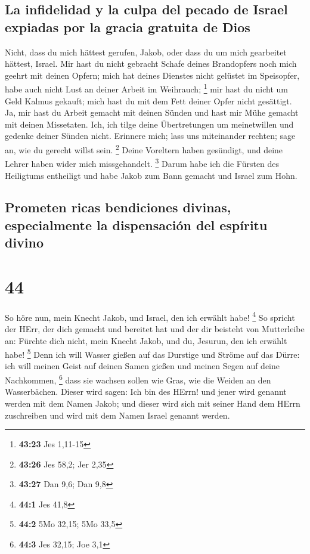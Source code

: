 \hypertarget{la-infidelidad-y-la-culpa-del-pecado-de-israel-expiadas-por-la-gracia-gratuita-de-dios}{%
\subsection{La infidelidad y la culpa del pecado de Israel expiadas por
la gracia gratuita de
Dios}\label{la-infidelidad-y-la-culpa-del-pecado-de-israel-expiadas-por-la-gracia-gratuita-de-dios}}

 Nicht, dass du mich hättest gerufen, Jakob, oder dass du
um mich gearbeitet hättest, Israel.  Mir hast du nicht
gebracht Schafe deines Brandopfers noch mich geehrt mit deinen Opfern;
mich hat deines Dienstes nicht gelüstet im Speisopfer, habe auch nicht
Lust an deiner Arbeit im Weihrauch; \footnote{\textbf{43:23} Jes 1,11-15}
 mir hast du nicht um Geld Kalmus gekauft; mich hast du
mit dem Fett deiner Opfer nicht gesättigt. Ja, mir hast du Arbeit
gemacht mit deinen Sünden und hast mir Mühe gemacht mit deinen
Missetaten.  Ich, ich tilge deine Übertretungen um
meinetwillen und gedenke deiner Sünden nicht.  Erinnere
mich; lass uns miteinander rechten; sage an, wie du gerecht willst sein.
\footnote{\textbf{43:26} Jes 58,2; Jer 2,35}  Deine
Voreltern haben gesündigt, und deine Lehrer haben wider mich
missgehandelt. \footnote{\textbf{43:27} Dan 9,6; Dan 9,8}
 Darum habe ich die Fürsten des Heiligtums entheiligt und
habe Jakob zum Bann gemacht und Israel zum Hohn.

\hypertarget{prometen-ricas-bendiciones-divinas-especialmente-la-dispensaciuxf3n-del-espuxedritu-divino}{%
\subsection{Prometen ricas bendiciones divinas, especialmente la
dispensación del espíritu
divino}\label{prometen-ricas-bendiciones-divinas-especialmente-la-dispensaciuxf3n-del-espuxedritu-divino}}

\hypertarget{section-43}{%
\section{44}\label{section-43}}

 So höre nun, mein Knecht Jakob, und Israel, den ich
erwählt habe! \footnote{\textbf{44:1} Jes 41,8}  So
spricht der HErr, der dich gemacht und bereitet hat und der dir beisteht
von Mutterleibe an: Fürchte dich nicht, mein Knecht Jakob, und du,
Jesurun, den ich erwählt habe! \footnote{\textbf{44:2} 5Mo 32,15; 5Mo
  33,5}  Denn ich will Wasser gießen auf das Durstige und
Ströme auf das Dürre: ich will meinen Geist auf deinen Samen gießen und
meinen Segen auf deine Nachkommen, \footnote{\textbf{44:3} Jes 32,15;
  Joe 3,1}  dass sie wachsen sollen wie Gras, wie die
Weiden an den Wasserbächen.  Dieser wird sagen: Ich bin
des HErrn! und jener wird genannt werden mit dem Namen Jakob; und dieser
wird sich mit seiner Hand dem HErrn zuschreiben und wird mit dem Namen
Israel genannt werden.

